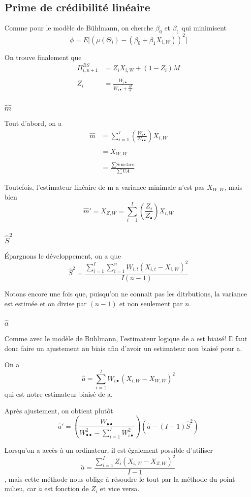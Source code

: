 \subsection{ Prime de crédibilité linéaire}
Comme pour le modèle de Bühlmann, on cherche $\beta_0$ et $\beta_1$ qui minimisent 
$$\phi = E\bigg[\left(\mu(\Theta_i)-(\beta_0+\beta_1 X_{i,W}) \right)^2 \bigg]$$

On trouve finalement que
$$\begin{aligned}
\Pi_{i,n+1}^{BS} &= Z_i X_{i,W} + (1-Z_i)M \\ \\
Z_i &= \frac{W_{i \bullet}}{W_{i \bullet} +\frac{S^2}{a}}
\end{aligned}$$

\subsubsection{$\widehat{m}$ } 

Tout d'abord, on a 
$$\boxed{\begin{aligned}
\widehat{m} &= \sum_{i=1}^I \left(\frac{W_{i \bullet}}{W_{\bullet \bullet}}\right) X_{i,W} \\ \\
&= X_{W,W} \\ \\
&= \frac{\sum \text{Sinistres}}{\sum UA}
\end{aligned}}$$

Toutefois, l'estimateur linéaire de m a variance minimale n'est pas $X_{W,W}$, mais bien
$$\boxed{\widehat{m}' = X_{Z,W} = \sum_{i=1}^I \left(\frac{Z_i}{Z_{\bullet}} \right) X_{i,W}}$$

\subsubsection{ $\widehat{S}^2$}
Épargnons le développement, on a que 
$$\boxed{\widehat{S}^2 = \frac{\sum_{i=1}^I \sum_{t=1}^n W_{i,t} (X_{i,t} - X_{i,W})^2}{I(n-1)}}$$

Notons encore une fois que, puisqu'on ne connait pas les ditrbutions, la variance est estimée et on divise par $(n-1)$ et non seulement par $n$.

\subsubsection{$\widehat{a}$ } 
Comme avec le modèle de Bühlmann, l'estimateur logique de a est biaisé! Il faut donc faire un ajustement au biais afin d'avoir un estimateur non biaisé pour a.

On a
$$\boxed{\widehat{a} = \sum_{i=1}^I W_{i \bullet} (X_{i,W}-X_{W,W})^2}$$
qui est notre estimateur biaisé de a. 

Après ajustement, on obtient plutôt
$$\boxed{\widehat{a}' = \left(\frac{W_{\bullet \bullet}}{W_{\bullet \bullet}^2 - \sum_{i=1}^I W_{i \bullet}^2} \right) \left(\widehat{a} - (I-1)\widehat{S}^2 \right)}$$

Lorsqu'on a accès à un ordinateur, il est également possible d'utiliser
$$\boxed{\tilde{a} = \frac{\sum_{i=1}^I Z_i(X_{i,W} - X_{Z,W})^2}{I-1}}$$
, mais cette méthode nous oblige à résoudre le tout par la méthode du point milieu, car $\tilde{a}$ est fonction de $Z_i$ et vice versa.

